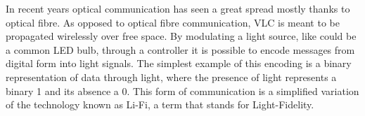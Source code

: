 
In recent years optical communication has seen a great spread mostly thanks to optical fibre.
As opposed to optical fibre communication, VLC is meant to be propagated wirelessly over free space.
By modulating a light source, like could be a common LED bulb, through a controller it is possible to encode messages from digital form into light signals.
The simplest example of this encoding is a binary representation of data through light, where the presence of light represents a binary 1 and its absence a 0.
This form of communication is a simplified variation of the technology known as Li-Fi, a term that stands for Light-Fidelity.


